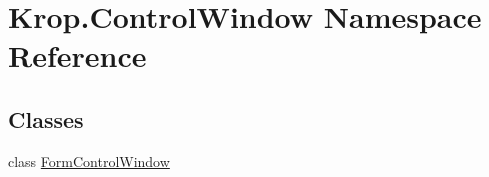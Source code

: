 \hypertarget{namespace_krop_1_1_control_window}{}\section{Krop.\+Control\+Window Namespace Reference}
\label{namespace_krop_1_1_control_window}
\subsection*{Classes}
\begin{DoxyCompactItemize}
\item 
class \mbox{\hyperlink{class_krop_1_1_control_window_1_1_form_control_window}{Form\+Control\+Window}}
\end{DoxyCompactItemize}
